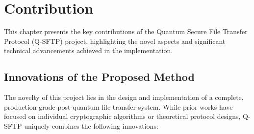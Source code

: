 \chapter{Contribution}
\label{chap.5}

This chapter presents the key contributions of the Quantum Secure File Transfer Protocol (Q-SFTP) project, highlighting the novel aspects and significant technical advancements achieved in the implementation.

\section{Innovations of the Proposed Method}

The novelty of this project lies in the design and implementation of a complete, production-grade post-quantum file transfer system. While prior works have focused on individual cryptographic algorithms or theoretical protocol designs, Q-SFTP uniquely combines the following innovations:

